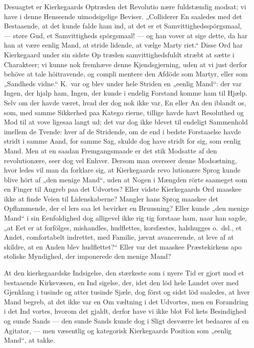\documentclass[12pt,a4paper]{article}
\newcommand{\opage}[1]{\marginnote{\footnotesize\textit{[#1]}}}
\begin{document}
Desuagtet er Kierkegaards Optræden det Revolutio\-%
nære fuldstændig modsat; vi have i denne Henseende
uimodsigelige Beviser. „Colliderer En saaledes med det
Bestaaende, at det kunde falde ham ind, at det er et
Samvittighedsspörgsmaal, --- støre Gud, et Samvittigheds\-%
spörgsmaal! --- og han vover at sige dette, da har han
at være eenlig Mand, at stride lidende, at vælge Marty\-%
riet.“ Disse Ord har Kierkegaard under sin sidste Op\-%
træden samvittighedsfuldt stræbt at sætte i Charakteer;
vi kunne nok fremhæve denne Kjendsgjerning, uden at
vi just derfor behöve at tale höitravende, og compli\-%
mentere den Afdöde som Martyr, eller som „Sandheds\-%
vidne.“ K.\ var og blev under hele Striden en „eenlig
Mand“: der var Ingen, der hjalp ham, Ingen, der kunde
i endelig Forstand komme ham til Hjælp. Selv om der
havde været, hvad der dog nok ikke var, En eller An\-%
den iblandt os, som, med samme Sikkerhed paa Katego\-%
rierne, tillige havde havt Resoluthed og Mod til at vove
ligesaa langt ud; det var dog ikke blevet til endeligt
Sammenhold imellem de Tvende: hver af de Stridende,
om de end i bedste Forstaaelse havde stridt i samme
Aand, for samme Sag, skulde dog have stridt for sig,
som eenlig Mand. Men at en saadan Fremgangsmaade
er det stik Modsatte af den revolutionære, seer dog vel
Enhver. Dersom man overseer denne Modsætning, hvor\-%
ledes vil man da forklare sig, at Kierkegaards revo\-%
lutionære Sprog kunde blive hört af „den menige Mand“,
uden at Nogen i Mængden rörte saameget som en Finger
til Angreb paa det Udvortes? Eller vidste Kierkegaards
Ord maaskee ikke at finde Veien til Lidenskaberne?
Mangler hans Sprog maaskee det Opflammende, der el\-%
lers saa let bevirker en Bruusning? Eller kunde „den
\opage{29} menige Mand“ i sin Eenfoldighed dog alligevel ikke rig\-%
tig forstaae ham, naar han sagde, „at Eet er at forfölges,
mishandles, hudflettes, korsfæstes, halshugges o.\ dsl.,
et Andet, comfortabelt indrettet, med Familie, jævnt
avancerende, at leve af at skildre, at en Anden blev
hudflettet?“ Eller var det maaskee Præstekirkens apo\-%
stoliske Myndighed, der imponerede den menige Mand?

At den kierkegaardske Indsigelse, den stærkeste som i
nyere Tid er gjort mod et bestaaende Kirkevæsen, en Ind\-%
sigelse, der, idet den löd hele Landet over med Gjenklang
i tusinde og atter tusinde Sjæle, dog först og sidst löd
saaledes, at hver Mand begreb, at det ikke var en Om\-%
væltning i det Udvortes, men en Forandring i det Ind\-%
vortes, hvorom det gjaldt, derfor have vi ikke blot Fol\-%
kets Besindighed og sunde Sands --- den sunde Sands
kunde dog i Sligt desværre let bedaares af en Agitator,
--- men væsentlig og kategorisk Kierkegaards Position som
„eenlig Mand“, at takke.
\end{document}
